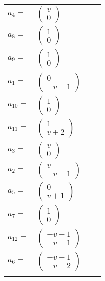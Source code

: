 \documentclass[1p]{elsarticle_modified}
\theoremstyle{definition}
\begin{document}
\begin{tabular}{m{7pt} m{180pt} m{7pt} m{180pt} }
\flushright $a_{4}=$&$\begin{pmatrix}v\\0\end{pmatrix}$ \\
\flushright $a_{8}=$&$\begin{pmatrix}1\\0\end{pmatrix}$ \\
\flushright $a_{9}=$&$\begin{pmatrix}1\\0\end{pmatrix}$ \\
\flushright $a_{1}=$&$\begin{pmatrix}0\\- v-1\end{pmatrix}$ \\
\flushright $a_{10}=$&$\begin{pmatrix}1\\0\end{pmatrix}$ \\
\flushright $a_{11}=$&$\begin{pmatrix}1\\v+2\end{pmatrix}$ \\
\flushright $a_{3}=$&$\begin{pmatrix}v\\0\end{pmatrix}$ \\
\flushright $a_{2}=$&$\begin{pmatrix}v\\- v-1\end{pmatrix}$ \\
\flushright $a_{5}=$&$\begin{pmatrix}0\\v+1\end{pmatrix}$ \\
\flushright $a_{7}=$&$\begin{pmatrix}1\\0\end{pmatrix}$ \\
\flushright $a_{12}=$&$\begin{pmatrix}- v-1\\- v-1\end{pmatrix}$ \\
\flushright $a_{6}=$&$\begin{pmatrix}- v-1\\- v-2\end{pmatrix}$\\&\end{tabular}
\end{document}
